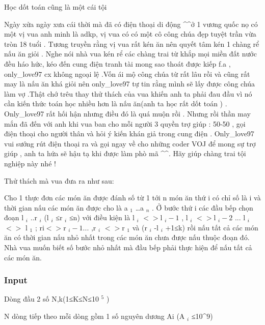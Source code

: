 



   Học dốt toán cũng là một cái tội  



   Ngày xửa ngày xưa cái thời mà đã có điện thoại di động \textasciicircum\textasciicircum ở 1 vương quốc nọ có một vị vua anh minh là adkp, vị vua có có một cô công chúa đẹp tuyệt trần vừa tròn 18 tuổi . Tương truyền rằng vị vua rất kén ăn nên quyết tâm kén 1 chàng rể nấu ăn giỏi . Nghe nói nhà vua kén rể các chàng trai từ khắp mọi miền đất nước đều háo hức, kéo đến cung điện tranh tài mong sao thoát được kiếp f.a , only\_love97 cx không ngoại lệ .Vốn ái mộ công chúa từ rất lâu rồi và cũng rất may là nấu ăn khá giỏi nên only\_love97 tự tin rằng mình sẽ lấy được công chúa làm vợ .Thật chớ trêu thay thử thách của vua khiến anh ta phải đau đầu vì nó cần kiến thức toán học nhiều hơn là nấu ăn(anh ta học rất dốt toán ) . Only\_love97 rất hối hận nhưng điều đó là quá muộn rồi . Nhưng rồi thần may mắn đã đến với anh khi vua ban cho mỗi người 3 quyền trợ giúp : 50-50 , gọi điện thoại cho người thân và hỏi ý kiến khán giả trong cung điện . Only\_love97 vui sướng rút điện thoại ra và gọi ngay về cho những coder VOJ để mong sự trợ giúp , anh ta hứa sẽ hậu tạ khi được làm phò mã \textasciicircum\textasciicircum. Hãy giúp chàng trai tội nghiệp này nhé !  

   Thử thách mà vua đưa ra như sau:  

   Cho 1 thực đơn các món ăn được đánh số từ 1 tới n món ăn thứ i có chỉ số là i và thời gian nấu các món ăn được cho là a   $_    1   $   …a   $_    n   $   . Ở bước thứ i các đầu bếp chọn đoạn l   $_    i   $   ..r   $_    i   $   (l   $_    i   $   ≤r   $_    i   $   ≤n) với điều kiện là l   $_    i   $   $<$$>$l   $_    i-1   $   , l   $_    i   $   $<$$>$l   $_    i-2   $   ... l   $_    i   $   $<$$>$ l   $_    1   $   ; ri$<$$>$r   $_    i-1...   $   ,r   $_    i   $   $<$$>$r   $_    1   $   và (r   $_    i   $   -l   $_    i   $   +1≤k) rồi nấu tất cả các món ăn có thời gian nấu nhỏ nhất trong các món ăn chưa được nấu thuộc đoạn đó. Nhà vua muốn biết số bước nhỏ nhất mà đầu bếp phải thực hiện để nấu tất cả các món ăn.  

\subsubsection{   Input  }

   Dòng đầu 2 số N,k(1≤K≤N≤10   $^    5   $   )  

   N dòng tiếp theo mỗi dòng gồm 1 số nguyên dương Ai (A   $_    i   $   ≤10\textasciicircum9)  

